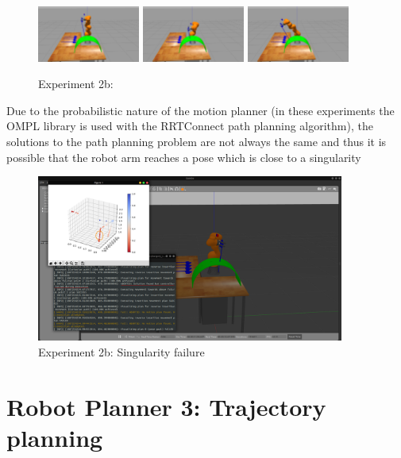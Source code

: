 \begin{center}
\begin{figure}[H]
\includegraphics[width=0.3\textwidth]{images/robot_planner2b/robot_planner2b_7}
\includegraphics[width=0.3\textwidth]{images/robot_planner2b/robot_planner2b_8}
\includegraphics[width=0.3\textwidth]{images/robot_planner2b/robot_planner2b_9}\\
\caption{Experiment 2b:}
\end{figure}
\end{center}

Due to the probabilistic nature of the motion planner (in these experiments the OMPL library is used with the RRTConnect path planning algorithm), the solutions 
to the path planning problem are not always the same and thus it is possible that the robot arm reaches a pose which is close to a singularity
\begin{center}
\begin{figure}[H]
\centering
\includegraphics[width=0.9\textwidth]{images/robot_planner2b/singularity_failure.png}
\caption{Experiment 2b: Singularity failure}
\end{figure}
\end{center}

\section{Robot Planner 3: Trajectory planning}

